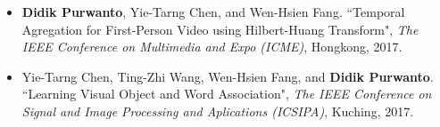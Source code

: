 \begin{itemize}
    \item \textbf{Didik Purwanto}, Yie-Tarng Chen, and Wen-Hsien Fang. ``Temporal Agregation for First-Person Video using Hilbert-Huang Transform", \textit{The IEEE Conference on Multimedia and Expo (ICME)}, Hongkong, 2017.
    \item Yie-Tarng Chen, Ting-Zhi Wang, Wen-Hsien Fang, and \textbf{Didik Purwanto}. ``Learning Visual Object and Word Association", \textit{The IEEE Conference on Signal and Image Processing and Aplications (ICSIPA)}, Kuching, 2017.
\end{itemize}